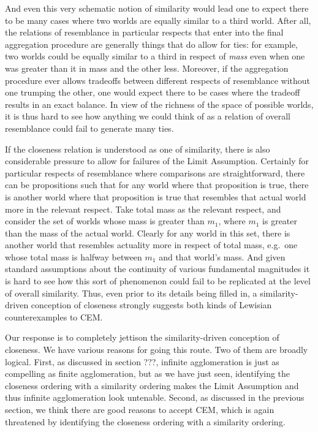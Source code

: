 \documentclass[If.tex]{subfiles}
\begin{document}
And even this very schematic notion of similarity would lead one to expect there to be many cases where two worlds are equally similar to a third world. After all, the relations of resemblance in particular respects that enter into the final aggregation procedure are generally things that do allow for ties: for example, two worlds could be equally similar to a third in respect of \emph{mass} even when one was greater than it in mass and the other less. Moreover, if the aggregation procedure ever allows tradeoffs between different respects of resemblance without one trumping the other, one would expect there to be cases where the tradeoff results in an exact balance. In view of the richness of the space of possible worlds, it is thus hard to see how anything we could think of as a relation of overall resemblance could fail to generate many ties.

If the closeness relation is understood as one of similarity, there is also considerable pressure to allow for failures of the Limit Assumption. Certainly for particular respects of resemblance where comparisons are straightforward, there can be propositions such that for any world where that proposition is true, there is another world where that proposition is true that resembles that actual world more in the relevant respect. Take total mass as the relevant respect, and consider the set of worlds whose mass is greater than $m_1$, where $m_1$ is greater than the mass of the actual world. Clearly for any world in this set, there is another world that resembles actuality more in respect of total mass, e.g.~one whose total mass is halfway between $m_1$ and that world's mass. And given standard assumptions about the continuity of various fundamental magnitudes it is hard to see how this sort of phenomenon could fail to be replicated at the level of overall similarity. Thus, even prior to its details being filled in, a similarity-driven conception of closeness strongly suggests both kinds of Lewisian counterexamples to CEM.

Our response is to completely jettison the similarity-driven conception of closeness. We have various reasons for going this route. Two of them are broadly logical. First, as discussed in section ???, infinite agglomeration is just as compelling as finite agglomeration, but as we have just seen, identifying the closeness ordering with a similarity ordering makes the Limit Assumption and thus infinite agglomeration look untenable. Second, as discussed in the previous section, we think there are good reasons to accept CEM, which is again threatened by identifying the closeness ordering with a similarity ordering. 
\end{document}
